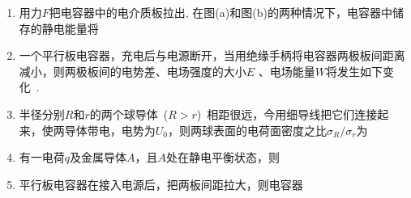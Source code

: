 \begin{enumerate}
    \item 用力$F$把电容器中的电介质板拉出, 在图(a)和图(b)的两种情况下，电容器中储存的静电能量将~\spaces
    \item 一个平行板电容器，充电后与电源断开，当用绝缘手柄将电容器两极板间距离减小，则两极板间的电势差、电场强度的大小$E$ 、电场能量$W$将发生如下变化~\spaces.
    \item 半径分别$R$和$r$的两个球导体~($R>r$)~相距很远，今用细导线把它们连接起来，使两导体带电，电势为$U_0$，则两球表面的电荷面密度之比$\sigma_R/\sigma_r$为~\spaces
    \item 有一电荷$q$及金属导体$A$，且$A$处在静电平衡状态，则~\spaces
    \item 平行板电容器在接入电源后，把两板间距拉大，则电容器~\spaces
\end{enumerate}
